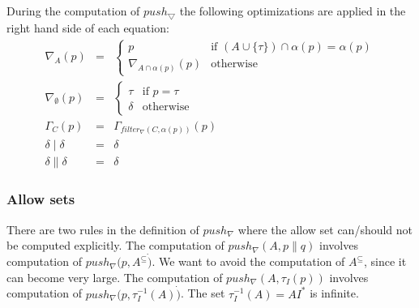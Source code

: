 \documentclass{article}
\begin{document}
During the computation of $push_{\bigtriangledown }$ the following
optimizations are applied in the right hand side of each equation:%
\[
\begin{array}{lll}
\nabla _{A}(p) & = & \left\{
\begin{array}{ll}
p & \text{if }(A\cup \{\tau \})\cap \alpha (p)=\alpha (p) \\
\nabla _{A\cap \alpha (p)}(p) & \text{otherwise}%
\end{array}%
\right. \\
\nabla _{\emptyset }(p) & = & \left\{
\begin{array}{ll}
\tau & \text{if }p=\tau \\
\delta & \text{otherwise}%
\end{array}%
\right. \\
\Gamma _{C}(p) & = & \Gamma _{filter_{\nabla }(C,\alpha (p))}(p) \\
\delta \mid \delta & = & \delta \\
\delta \parallel \delta & = & \delta%
\end{array}%
\]

\subsubsection{Allow sets}

There are two rules in the definition of $push_{\nabla }$ where the allow
set can/should not be computed explicitly. The computation of $push_{\nabla
}(A,p\parallel q)$ involves computation of $push_{\nabla }(p,A^{\subseteq }%
\dot{)}$. We want to avoid the computation of $A^{\subseteq }$, since it can
become very large. The computation of $push_{\nabla }(A,\tau _{I}(p))$
involves computation of $push_{\nabla }(p,\tau _{I}^{-1}(A)\dot{)}$. The set
$\tau _{I}^{-1}(A)=AI^{\ast }$ is infinite.
\end{document}
